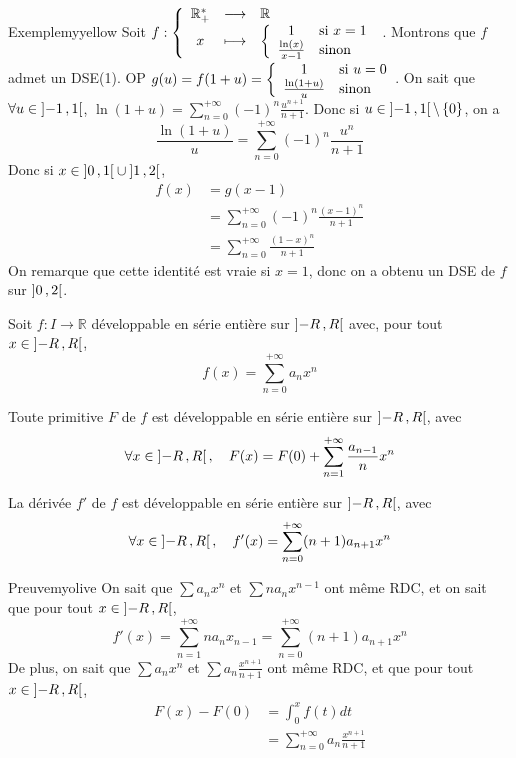     \begin{omed}{Exemple}{myyellow}
        Soit $\fonction{f}{\mathbb{R}_+^*}{\mathbb{R}}{x}{\sisinon{1}{x=1}{\frac{\ln(x)}{x-1}}}$. Montrons que $f$ admet un DSE(1). OP $g(u) = f(1+u) = \sisinon{1}{u=0}{\frac{\ln(1+u)}{u}}$. On sait que $\forall u \in \left] -1 \, , 1 \right[$, $\ln(1+u) = \sum_{n=0}^{+\infty} (-1)^n \frac{u^{n+1}}{n+1}$. Donc si $u \in \left] -1 \, , 1 \right[ \backslash \left\{0\right\}$, on a 
        \[ \frac{\ln(1+u)}{u} = \sum_{n=0}^{+\infty} (-1)^n \frac{u^n}{n+1} \]   
        Donc si $x \in \left] 0 \, , 1 \right[ \cup \left] 1 \, , 2 \right[$, 
        \begin{align*}
            f(x) &= g(x-1) \\
            &= \sum_{n=0}^{+\infty} (-1)^n \frac{(x-1)^n}{n+1} \\
            &= \sum_{n=0}^{+\infty} \frac{(1-x)^n}{n+1}
        \end{align*}
        On remarque que cette identité est vraie si $x = 1$, donc on a obtenu un DSE de $f$ sur $\left] 0 \, , 2 \right[$. 
    \end{omed}

    \begin{prop}{}{}
        Soit $f : I \to \mathbb{R}$ développable en série entière sur $\left] -R \, , R \right[$ avec, pour tout $x \in \left] -R \, , R \right[$, 
        \[ f(x) = \sum_{n=0}^{+\infty} a_n x^n \]
        \begin{alors}
            \item Toute primitive $F$ de $f$ est développable en série entière sur $\left] -R \, , R \right[$, avec 
            \[ \forall x \in \left] -R \, , R \right[, \quad F(x) = F(0) + \sum_{n=1}^{+\infty} \frac{a_{n-1}}{n} x^n \]
            \item La dérivée $f'$ de $f$ est développable en série entière sur $\left] -R \, , R \right[$, avec 
            \[ \forall x \in \left] -R \, , R \right[, \quad f'(x) = \sum_{n=0}^{+\infty} (n+1) a_{n+1} x^n \]
        \end{alors}
    \end{prop}

    \begin{demo}{Preuve}{myolive}
        On sait que $\sum a_n x^n$ et $\sum n a_n x^{n-1}$ ont même RDC, et on sait que pour tout $x \in \left] -R \, , R \right[$, 
        \[ f'(x) = \sum_{n=1}^{+\infty} n a_n x_{n-1} = \sum_{n=0}^{+\infty} (n+1) a_{n+1} x^n \]   
        De plus, on sait que $\sum a_n x^n$ et $\sum a_n \frac{x^{n+1}}{n+1}$ ont même RDC, et que pour tout $x \in \left] -R \, , R \right[$, 
        \begin{align*}
            F(x) - F(0) 
            &= \int_{0}^{x} f(t)dt \\
            &= \sum_{n=0}^{+\infty} a_n \frac{x^{n+1}}{n+1}
        \end{align*}
    \end{demo}

